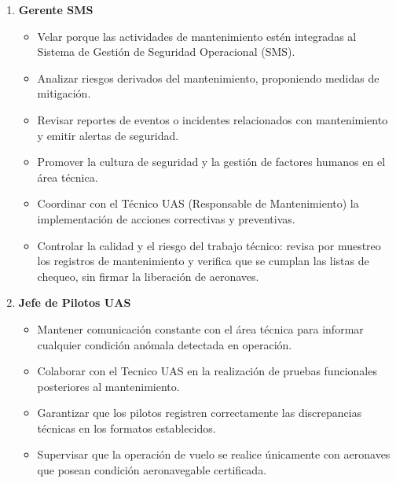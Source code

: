 \begin{enumerate}
\begin{itemize}
            \item \textbf{Apoyo en la gestión técnica:} Colaborar en la actualización del inventario de herramientas, componentes y registros técnicos bajo supervisión del Jefe de Pilotos y del Gerente General.

            \item \textbf{Control documental:} Asegurar que todos los documentos utilizados correspondan a versiones vigentes y que los registros se archiven conforme al sistema de gestión documental del MCM.

            \item \textbf{Factores humanos:} Mantener condiciones físicas y mentales adecuadas para el desempeño de sus labores, evitando trabajar bajo fatiga, estrés o presión excesiva.
        \end{itemize}
    \item \textbf{Gerente SMS}
        \begin{itemize}
            \item Velar porque las actividades de mantenimiento estén integradas al Sistema de Gestión de Seguridad Operacional (SMS).
            \item Analizar riesgos derivados del mantenimiento, proponiendo medidas de mitigación.
            \item Revisar reportes de eventos o incidentes relacionados con mantenimiento y emitir alertas de seguridad.
            \item Promover la cultura de seguridad y la gestión de factores humanos en el área técnica.
            \item Coordinar con el Técnico UAS (Responsable de Mantenimiento) la implementación de acciones correctivas y preventivas.
            \item Controlar la calidad y el riesgo del trabajo técnico: revisa por muestreo los registros de mantenimiento y verifica que se cumplan las listas de chequeo, sin firmar la liberación de aeronaves.
        \end{itemize}
    \item \textbf{Jefe de Pilotos UAS}
        \begin{itemize}
            \item Mantener comunicación constante con el área técnica para informar cualquier condición anómala detectada en operación.
            \item Colaborar con el Tecnico UAS en la realización de pruebas funcionales posteriores al mantenimiento.
            \item Garantizar que los pilotos registren correctamente las discrepancias técnicas en los formatos establecidos.
            \item Supervisar que la operación de vuelo se realice únicamente con aeronaves que posean condición aeronavegable certificada.
        \end{itemize}

\end{enumerate}

